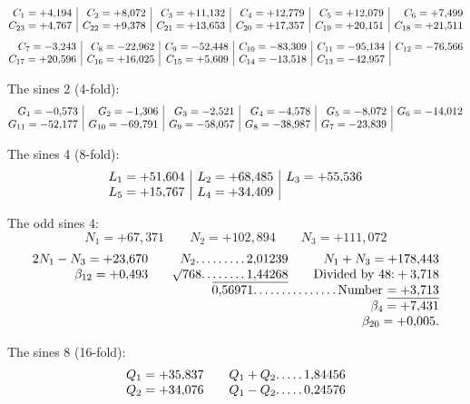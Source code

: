 \begin{landscape}
\[\begin{array}{@{}r|r|r|r|r|r@{}}
C_1=+4{,}194&C_2=+8{,}072&C_3=+11{,}132&C_4=+12{,}779&C_5=+12{,}079&C_6=+7{,}499\\
C_{23}=+4{,}767&C_{22}=+9{,}378&C_{21}=+13{,}653&C_{20}=+17{,}357&C_{19}=+20{,}151&C_{18}=+21{,}511
\end{array}
\]
\[
\begin{array}{@{}r|r|r|r|r|r@{}}
C_7=-3{,}243&C_8=-22{,}962&C_9=-52{,}448&C_{10}=-83{,}309&C_{11}=-95{,}134&C_{12}=-76{,}566\\
C_{17}=+20{,}596&C_{16}=+16{,}025&C_{15}=+5{,}609&C_{14}=-13{,}518&C_{13}=-42{,}957&
\end{array}
\]
\par\noindent\hspace*{\parindent}The sines 2 (4-fold):
\[
\begin{array}{@{}r|r|r|r|r|r@{}}
G_1=-0{,}573&G_2=-1{,}306&G_3=-2{,}521&G_4=-4{,}578&G_5=-8{,}072&G_6=-14{,}012\\
G_{11}=-52{,}177&G_{10}=-69{,}791&G_9=-58{,}057&G_8=-38{,}987&G_7=-23{,}839&
\end{array}
\]
\clearpage{}
\par\noindent\hspace*{\parindent}The sines 4 (8-fold):
\[
\begin{array}{@{}r|r|r@{}}
L_1=+51{,}604&L_2=+68{,}485&L_3=+55{,}536\\
L_5=+15{,}767&L_4=+34{,}409&
\end{array}
\]
\par\noindent\hspace*{\parindent}The odd sines 4:
\[N_1=+67{,}371\qquad N_2=+102{,}894\qquad N_3=+111{,}072\]
\[
\begin{array}{@{}r@{\qquad}r@{\qquad}r@{}}
2N_1-N_3=+23{,}670&N_2\VfourDots{8}2{,}01239&N_1+N_3=+178{,}443\\
\beta_{12}=+0{,}493&\BareRoot{768}\VfourDots{1}\underline{\VfourDots{5}1{,}44268}&\text{Divided by 48:}+3{,}718\\
&\multicolumn{2}{r@{}}{0{,}56971\VfourDots{14}\text{Number}\ \underline{=+3{,}713}}\\
&&\beta_4=+7{,}431\\
&&\beta_{20}=+0{,}005.
\end{array}
\]
\par\noindent\hspace*{\parindent}The sines 8 (16-fold):
\[
\begin{array}{@{}r@{\qquad}r@{}}
Q_1=+35{,}837&Q_1+Q_2\VfourDots{4}1{,}84456\\
Q_2=+34{,}076&Q_1-Q_2\VfourDots{4}0{,}24576\\

\end{array}\]
\end{landscape}
